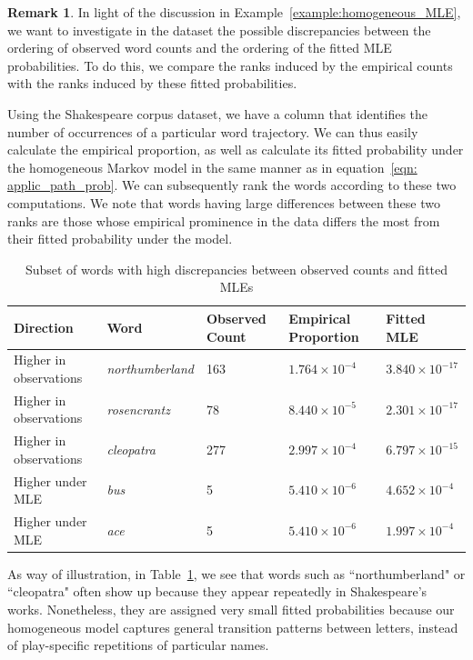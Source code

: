 \documentclass[11pt, a4paper]{article}
\numberwithin{equation}{section}
\theoremstyle{plain}
\theoremstyle{definition}
\newtheorem{remark}[theorem]{Remark}
\begin{document}
\begin{remark} 
In light of the discussion in Example~\ref{example:homogeneous_MLE}, we want to investigate in the dataset the possible discrepancies between the ordering of observed word counts and the ordering of the fitted MLE probabilities. To do this, we compare the ranks induced by the empirical counts with the ranks induced by these fitted probabilities. 

Using the Shakespeare corpus dataset, we have a column that identifies the number of occurrences of a particular word trajectory. We can thus easily calculate the empirical proportion, as well as calculate its fitted probability under the homogeneous Markov model in the same manner as in equation~\eqref{eqn: applic_path_prob}. We can subsequently rank the words according to these two computations. We note that words having large differences between these two ranks are those whose empirical prominence in the data differs the most from their fitted probability under the model. 

\begin{table}[ht]
\centering
\caption{Subset of words with high discrepancies between observed counts and fitted MLEs}
\label{tab:word_rank_discrepancies}
\begin{tabular}{l l l l l}
\toprule
Direction & Word & Observed Count & Empirical Proportion & Fitted MLE \\
\midrule
Higher in observations & \textit{northumberland} & 163 & \(1.764\times 10^{-4}\) & \(3.840\times 10^{-17}\)  \\
Higher in observations & \textit{rosencrantz} & 78 & \(8.440\times 10^{-5}\) & \(2.301\times 10^{-17}\)  \\
Higher in observations & \textit{cleopatra} & 277 & \(2.997\times 10^{-4}\) & \(6.797\times 10^{-15}\)  \\
\midrule
Higher under MLE & \textit{bus} & 5 & \(5.410\times 10^{-6}\) & \(4.652\times 10^{-4}\)  \\
Higher under MLE & \textit{ace} & 5 & \(5.410\times 10^{-6}\) & \(1.997\times 10^{-4}\)  \\
\bottomrule
\end{tabular}
\end{table}

As way of illustration, in Table~\ref{tab:word_rank_discrepancies}, we see that words such as ``northumberland" or ``cleopatra" often show up because they appear repeatedly in Shakespeare's works. Nonetheless, they are assigned very small fitted probabilities because our homogeneous model captures general transition patterns between letters, instead of play-specific repetitions of particular names. 


\end{remark}
\end{document}
